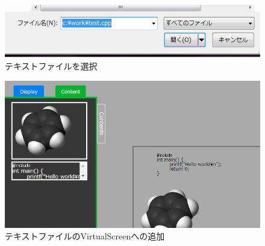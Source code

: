 \documentclass[a4paper,10pt,oneside]{jsbook}
\begin{document}
\begin{figure}[htbp]
	\begin{center}
		\includegraphics[width=11.5cm]{image/AddContent_TextFile_Select.png}
	\end{center}
	\caption{テキストファイルを選択}
	\label{fig:addtext}
\end{figure}


\begin{figure}[htbp]
	\begin{center}
		\includegraphics[width=15.5cm]{image/AddContent_TextFile_View.png}
	\end{center}
	\caption{テキストファイルのVirtualScreenへの追加}
	\label{fig:addtextfile}
\end{figure}

\newpage



\end{document}
